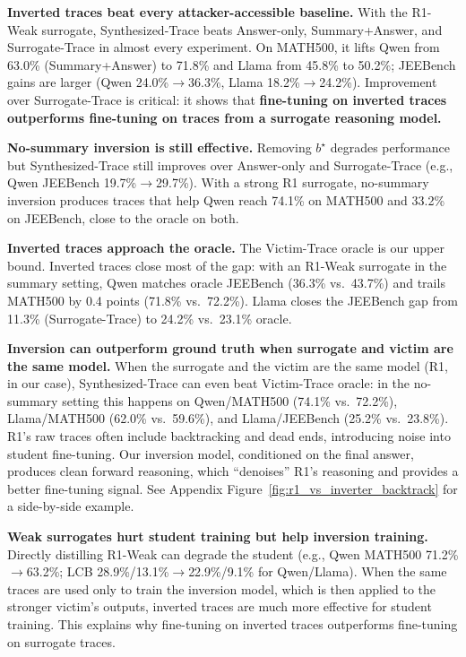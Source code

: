 \documentclass{article}
\begin{document}
\noindent\textbf{Inverted traces beat every attacker-accessible baseline.} With the R1-Weak surrogate, Synthesized-Trace beats Answer-only, Summary+Answer, and Surrogate-Trace in almost every experiment. On MATH500, it lifts Qwen from 63.0\% (Summary+Answer) to 71.8\% and Llama from 45.8\% to 50.2\%; JEEBench gains are larger (Qwen 24.0\%$\rightarrow$36.3\%, Llama 18.2\%$\rightarrow$24.2\%). Improvement over Surrogate-Trace is critical: it shows that \textbf{fine-tuning on inverted traces outperforms fine-tuning on traces from a surrogate reasoning model.}

\noindent\textbf{No-summary inversion is still effective.} Removing $b^\star$ degrades performance but Synthesized-Trace still improves over Answer-only and Surrogate-Trace (e.g., Qwen JEEBench 19.7\%$\rightarrow$29.7\%). With a strong R1 surrogate, no-summary inversion produces traces that help Qwen reach 74.1\% on MATH500 and 33.2\% on JEEBench, close to the oracle on both.

\noindent\textbf{Inverted traces approach the oracle.} The Victim-Trace oracle is our upper bound. Inverted traces close most of the gap: with an R1-Weak surrogate in the summary setting, Qwen matches oracle JEEBench (36.3\% vs.\ 43.7\%) and trails MATH500 by 0.4 points (71.8\% vs.\ 72.2\%). Llama closes the JEEBench gap from 11.3\% (Surrogate-Trace) to 24.2\% vs.\ 23.1\% oracle.

\noindent\textbf{Inversion can outperform ground truth when surrogate and victim are the same model.} When the surrogate and the victim are the same model (R1, in our case), Synthesized-Trace can even beat Victim-Trace oracle: in the no-summary setting this happens on Qwen/MATH500 (74.1\% vs.\ 72.2\%), Llama/MATH500 (62.0\% vs.\ 59.6\%), and Llama/JEEBench (25.2\% vs.\ 23.8\%). R1's raw traces often include backtracking and dead ends, introducing noise into student fine-tuning.  Our inversion model,  conditioned on the final answer, produces clean forward reasoning, which ``denoises'' R1's reasoning and provides a better fine-tuning signal.
See Appendix Figure~\ref{fig:r1_vs_inverter_backtrack} for a side-by-side example.

\noindent\textbf{Weak surrogates hurt student training but help inversion training.} Directly distilling R1-Weak can degrade the student (e.g., Qwen MATH500 71.2\%$\rightarrow$63.2\%; LCB 28.9\%/13.1\%$\rightarrow$22.9\%/9.1\% for Qwen/Llama).  When the same traces are used only to train the inversion model, which is then applied to the stronger victim's outputs, inverted traces are much more effective for student training.  This explains why fine-tuning on inverted traces outperforms fine-tuning on surrogate traces.
\end{document}
